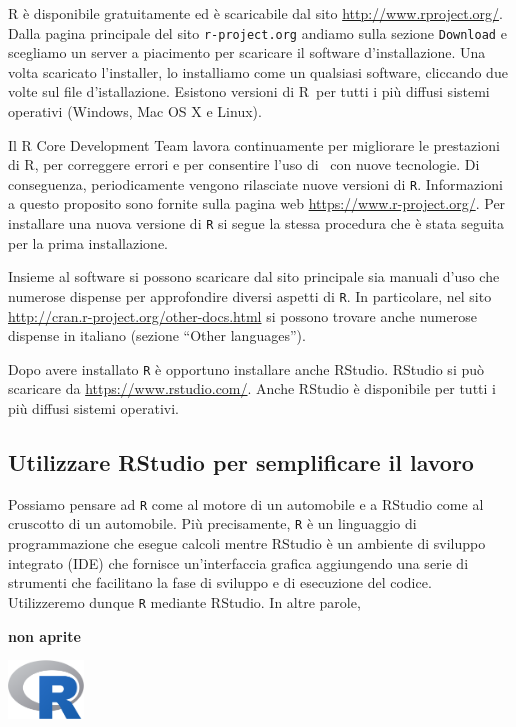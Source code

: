 \documentclass[
]{memoir}
\theoremstyle{definition}
\theoremstyle{definition}
\theoremstyle{definition}
\theoremstyle{definition}
\theoremstyle{remark}
\begin{document}
R è disponibile gratuitamente ed è scaricabile dal sito
\url{http://www.rproject.org/}. Dalla pagina principale del sito
\texttt{r-project.org} andiamo sulla sezione \texttt{Download} e scegliamo un server a
piacimento per scaricare il software d'installazione. Una volta
scaricato l'installer, lo installiamo come un qualsiasi software,
cliccando due volte sul file d'istallazione. Esistono versioni di R  per
tutti i più diffusi sistemi operativi (Windows, Mac OS X e Linux).

Il R Core Development Team lavora continuamente per migliorare le
prestazioni di R, per correggere errori e per consentire l'uso di   con
nuove tecnologie. Di conseguenza, periodicamente vengono rilasciate
nuove versioni di \texttt{R}. Informazioni a questo proposito sono fornite sulla
pagina web \url{https://www.r-project.org/}. Per installare una nuova
versione di \texttt{R} si segue la stessa procedura che è stata seguita per la
prima installazione.

Insieme al software si possono scaricare dal sito principale sia manuali d'uso che numerose dispense per approfondire diversi aspetti di \texttt{R}. In particolare, nel sito \url{http://cran.r-project.org/other-docs.html} si possono trovare anche numerose dispense in italiano (sezione ``Other languages'').

Dopo avere installato \texttt{R} è opportuno installare anche RStudio. RStudio si
può scaricare da \url{https://www.rstudio.com/}. Anche RStudio è disponibile
per tutti i più diffusi sistemi operativi.

\hypertarget{utilizzare-rstudio-per-semplificare-il-lavoro}{%
\subsection{Utilizzare RStudio per semplificare il lavoro}\label{utilizzare-rstudio-per-semplificare-il-lavoro}}

Possiamo pensare ad \texttt{R} come al motore di un automobile e a RStudio come
al cruscotto di un automobile. Più precisamente, \texttt{R} è un linguaggio di
programmazione che esegue calcoli mentre RStudio è un ambiente di
sviluppo integrato (IDE) che fornisce un'interfaccia grafica aggiungendo
una serie di strumenti che facilitano la fase di sviluppo e di
esecuzione del codice. Utilizzeremo dunque \texttt{R} mediante RStudio. In altre
parole,

\textbf{non aprite}

\includegraphics[width=0.15\textwidth,height=\textheight]{images/Rlogo.png}
\end{document}
